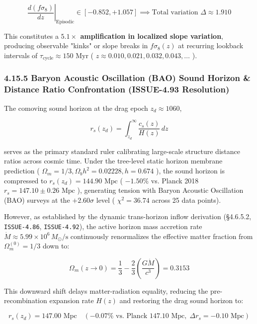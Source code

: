 \documentclass[11pt,a4paper]{article}
\theoremstyle{definition}\newtheorem{definition}{Definition}
\theoremstyle{remark}\newtheorem{remark}{Remark}
\begin{document}
\begin{equation}
\left.\frac{d(f\sigma_8)}{dz}\right|_{\text{Episodic}} \in [-0.852, +1.057] \implies \text{Total variation } \Delta \approx 1.910
\end{equation}


This constitutes a \textbf{$5.1\times$ amplification in localized slope variation}, producing observable "kinks" or slope breaks in $f\sigma_8(z)$ at recurring lookback intervals of $\tau_{\text{cycle}} \approx 150\text{ Myr}$ ( $z \approx 0.010, 0.021, 0.032, 0.043, \dots$ ).
\subsubsection{4.15.5 Baryon Acoustic Oscillation (BAO) Sound Horizon \& Distance Ratio Confrontation (ISSUE-4.93 Resolution)}

The comoving sound horizon at the drag epoch $z_d \approx 1060$,


\begin{equation}
r_s(z_d) = \int_{z_d}^\infty \frac{c_s(z)}{H(z)} \, dz
\end{equation}


serves as the primary standard ruler calibrating large-scale structure distance ratios across cosmic time. Under the tree-level static horizon membrane prediction ( $\Omega_m = 1/3, \Omega_b h^2 = 0.02228, h = 0.674$ ), the sound horizon is compressed to $r_s(z_d) = 144.90\text{ Mpc}$ ( $-1.50\%$ vs. Planck 2018 $r_s = 147.10 \pm 0.26\text{ Mpc}$ ), generating tension with Baryon Acoustic Oscillation (BAO) surveys at the $+2.60\sigma$ level ( $\chi^2 = 36.74$ across 25 data points).

However, as established by the dynamic trans-horizon inflow derivation (§4.6.5.2, \texttt{ISSUE-4.86}, \texttt{ISSUE-4.92}), the active horizon mass accretion rate $\dot{M} \approx 5.99 \times 10^6 \, M_\odot/\text{s}$ continuously renormalizes the effective matter fraction from $\Omega_m^{(0)} = 1/3$ down to:


\begin{equation}
\Omega_m(z \to 0) = \frac{1}{3} - \frac{2}{3}\left(\frac{G \dot{M}}{c^3}\right) = 0.3153
\end{equation}


This downward shift delays matter-radiation equality, reducing the pre-recombination expansion rate $H(z)$ and restoring the drag sound horizon to:


\begin{equation}
r_s(z_d) = 147.00\text{ Mpc} \quad (-0.07\% \text{ vs. Planck } 147.10\text{ Mpc}, \; \Delta r_s = -0.10\text{ Mpc})
\end{equation}
\end{document}

